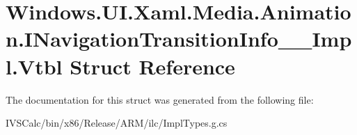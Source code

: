 \hypertarget{struct_windows_1_1_u_i_1_1_xaml_1_1_media_1_1_animation_1_1_i_navigation_transition_info_____impl_1_1_vtbl}{}\section{Windows.\+U\+I.\+Xaml.\+Media.\+Animation.\+I\+Navigation\+Transition\+Info\+\_\+\+\_\+\+Impl.\+Vtbl Struct Reference}
\label{struct_windows_1_1_u_i_1_1_xaml_1_1_media_1_1_animation_1_1_i_navigation_transition_info_____impl_1_1_vtbl}


The documentation for this struct was generated from the following file\+:\begin{DoxyCompactItemize}
\item 
I\+V\+S\+Calc/bin/x86/\+Release/\+A\+R\+M/ilc/Impl\+Types.\+g.\+cs\end{DoxyCompactItemize}
